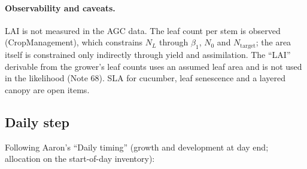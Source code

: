 \documentclass[11pt,a4paper]{article}
\begin{document}
\paragraph{Observability and caveats.} LAI is not measured in the AGC data. The leaf count per stem is observed
(CropManagement), which constrains $N_L$ through $\beta_1$, $N_0$ and $N_{\text{target}}$; the area itself is constrained
only indirectly through yield and assimilation. The ``LAI'' derivable from the grower's leaf counts uses an assumed
leaf area and is not used in the likelihood (Note 68). SLA for cucumber, leaf senescence and a layered canopy are
open items.

\subsection{Daily step}\label{sec:canopystep}
Following Aaron's ``Daily timing'' (growth and development at day end; allocation on the start-of-day inventory):
\end{document}
